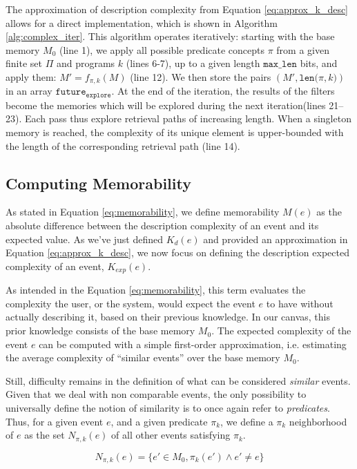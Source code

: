 \documentclass[conference]{IEEEtran}
\begin{document}
The approximation of description complexity from Equation \ref{eq:approx_k_desc} allows for
a direct implementation, which is shown in Algorithm \ref{alg:complex_iter}. This
algorithm operates iteratively: starting with the base memory $M_0$
(line 1), we apply all possible predicate concepts $\pi$ from a given finite set
$\Pi$ and programs $k$ (lines 6-7), up to a given length $\mathtt
{max\_len}$ bits, and apply them: $M' = f_{\pi, k}(M)$ (line 12). We then store
the pairs $(M', \mathtt{len(}\pi, k\mathtt{)})$ in an array $\mathtt{future_
{explore}}$. At the end of the iteration, the results of the filters become the
memories which will be explored during the next iteration(lines 21--23). Each
pass thus explore retrieval paths of increasing length. When a singleton memory
is reached, the complexity of its unique element is upper-bounded with the
length of the corresponding retrieval path (line 14).

\subsection{Computing Memorability}
As stated in Equation \ref{eq:memorability}, we define memorability $M(e)$ as the absolute difference between the description complexity of an event and its expected value. As we've just defined $K_d(e)$ and provided an approximation in Equation \ref{eq:approx_k_desc}, we now focus on defining the description expected complexity of an event, $K_{exp}(e)$.

As intended in the Equation \ref{eq:memorability}, this term evaluates the complexity the user, or the system, would expect the event $e$ to have without actually describing it, based on their previous knowledge. In our canvas, this prior knowledge consists of the base memory $M_0$. The expected complexity of the event $e$ can be computed with a simple first-order approximation, i.e. estimating the average complexity of ``similar events'' over the base memory $M_0$.

Still, difficulty remains in the definition of what
can be considered \emph{similar} events. Given that we deal with non comparable events, the only possibility to universally define the notion of similarity is to once again refer to \emph{predicates}. Thus, for a given event $e$, and a given predicate $\pi_k$, we define a $\pi_k$ neighborhood of $e$ as the set $N_{\pi, k}(e)$ of all other events satisfying $\pi_k$.

\begin{equation}
\label{eq:similar}
N_{\pi, k}(e) = \{e'\in M_0, \pi_k(e') \wedge e' \neq e\}
\end{equation}
\end{document}
